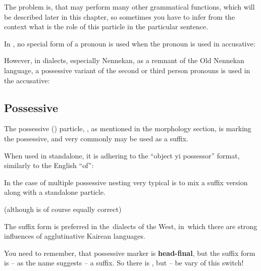 
The problem is, that  may perform many other grammatical functions,
which will be described later in this chapter, so sometimes you have to infer
from the context what is the role of this particle in the particular sentence.

In \ardo, no special form of a pronoun is used when the pronoun is used in
accusative:


However, in dialects, especially Nennekan, as a remnant of the Old Nennekan
language, a possessive variant of the second or third person pronouns is used in
the accusative:


\subsection{Possessive}

The possessive (\Poss{}) particle, , as mentioned in the morphology
section, is marking the possessive, and very commonly may be used as a suffix.

When used in standalone, it is adhering to the ``object yi possessor'' format,
similarly to the English ``of'':


In the case of multiple possessive nesting very typical is to mix a suffix
version along with a standalone particle.


(although  is of course equally
correct)

The suffix form is preferred in the~dialects of the West, in~which there are
strong influences of agglutinative Kairean languages.

You need to remember, that possessive marker is \textbf{head-final}, but the
suffix form is -- as the name suggests -- a suffix. So there is , but  -- be vary of this switch!

